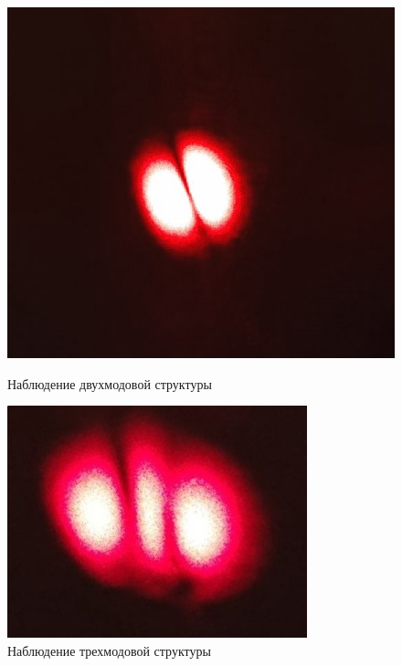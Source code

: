     \begin{figure}[h!]
    	\begin{center}
    		\begin{minipage}[h!]{0.48\linewidth}
    			\includegraphics[width=1\linewidth]{images/Двухмодовый.jpg}
    			\caption{Наблюдение двухмодовой структуры}
    			\label{image:Two_modes}
    		\end{minipage}
    		\hfill
    		\begin{minipage}[h!]{0.48\linewidth}
    			\includegraphics[width=1\linewidth]{images/Трехмодовый.jpg}
    			\caption{Наблюдение трехмодовой структуры}
    			\label{image:Three_modes}
    		\end{minipage}
    	\end{center}
    \end{figure}

